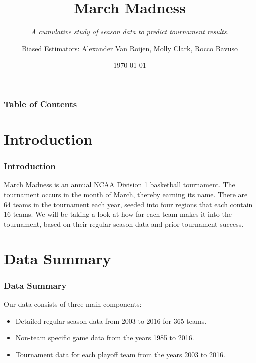 \documentclass[11pt]{beamer}
\begin{document}
	\author{\footnotesize Biased Estimators: Alexander Van Roijen, Molly Clark, Rocco Bavuso}
	\title{{\textbf{\huge March Madness}}}
	\subtitle{{\textit{\footnotesize A cumulative study of season data to predict tournament results.}}}
	\date{\today}
	\begin{frame}[plain]
	\maketitle
\end{frame}
\begin{frame}
\frametitle{\textbf{\huge Table of Contents}}
\tableofcontents
\end{frame}
\section{Introduction}
\begin{frame}
\frametitle{{\textbf{\huge Introduction}}}
\begin{center}
March Madness is an annual NCAA Division 1 basketball tournament. The tournament occurs in the month of March, thereby earning its name. There are 64 teams in the tournament each year, seeded into four regions that each contain 16 teams. We will be taking a look at how far each team makes it into the tournament, based on their regular season data and prior tournament success.
\end{center}
\end{frame}
\section{Data Summary}
\begin{frame}
\frametitle{{\textbf{\huge Data Summary}}}
\center
Our data consists of three main components:\\
\begin{itemize}
	\item Detailed regular season data from 2003 to 2016 for 365 teams.
	\item Non-team specific game data from the years 1985 to 2016.
	\item Tournament data  for each playoff team from the years 2003 to 2016.
\end{itemize}
\end{frame}
\end{document}
